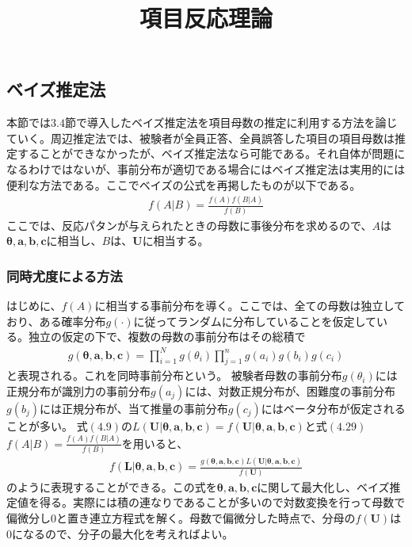 \documentclass[12pt]{jarticle}
\title{項目反応理論}
\begin{document}
\maketitle
\setcounter{section}{4}
\setcounter{subsection}{2}
\subsection{ベイズ推定法}
本節では$3.4$節で導入したベイズ推定法を項目母数の推定に利用する方法を論じていく。周辺推定法では、被験者が全員正答、全員誤答した項目の項目母数は推定することができなかったが、ベイズ推定法なら可能である。それ自体が問題になるわけではないが、事前分布が適切である場合にはベイズ推定法は実用的には便利な方法である。ここでベイズの公式を再掲したものが以下である。
\begin{align}
  \label{00}
  \displaystyle f(A|B) = \frac{f(A)f(B|A)}{f(B)}\tag{4.29}
\end{align}
ここでは、反応パタンが与えられたときの母数に事後分布を求めるので、$A$は$\boldsymbol{\theta,a,b,c}$に相当し、$B$は、$\boldsymbol{U}$に相当する。
\subsubsection{同時尤度による方法}
はじめに、$f(A)$に相当する事前分布を導く。ここでは、全ての母数は独立しており、ある確率分布$g(\cdot)$に従ってランダムに分布していることを仮定している。独立の仮定の下で、複数の母数の事前分布はその総積で
\begin{align}
  \label{01}
  \displaystyle
  g(\boldsymbol{\theta,a,b,c}) = \prod_{i = 1}^{N}g(\theta_i) \prod_{j = 1}^{n} g(a_i)g(b_i)g(c_i)  \tag{4.30}
\end{align}
と表現される。これを同時事前分布という。
被験者母数の事前分布$g(\theta_i)$には正規分布が識別力の事前分布$g(a_j)$には、対数正規分布が、困難度の事前分布$g(b_j)$には正規分布が、当て推量の事前分布$g(c_j)$にはベータ分布が仮定されることが多い。
式$(4.9)$の$L(\boldsymbol{U}|\boldsymbol{\theta,a,b,c}) = f(\boldsymbol{U}|\boldsymbol{\theta,a,b,c})$と式$(4.29)$ $\displaystyle f(A|B) = \frac{f(A)f(B|A)}{f(B)}$を用いると、
\begin{align}
  \label{02}
  \displaystyle
  f(\boldsymbol{L}|\boldsymbol{\theta,a,b,c}) = \frac{g(\boldsymbol{\theta,a,b,c})L(\boldsymbol{U}|\boldsymbol{\theta,a,b,c})}{f(\boldsymbol{U})} \tag{4.31}
\end{align}
のように表現することができる。この式を$\boldsymbol{\theta,a,b,c}$に関して最大化し、ベイズ推定値を得る。実際には積の連なりであることが多いので対数変換を行って母数で偏微分し$0$と置き連立方程式を解く。母数で偏微分した時点で、分母の$f(\boldsymbol{U})$は$0$になるので、分子の最大化を考えればよい。
\end{document}
